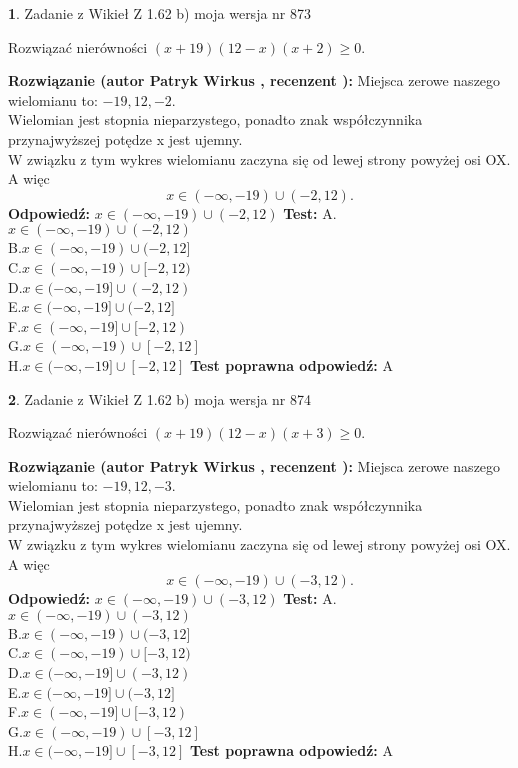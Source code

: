 \documentclass[12pt, a4paper]{article}
\theoremstyle{definition} %
\newtheorem{zad}{}
\newcommand{\zadStart}[1]{\begin{zad}#1\newline}
\newcommand{\zadStop}{\end{zad}}
\newcommand{\rozwStart}[2]{\noindent \textbf{Rozwiązanie (autor #1 , recenzent #2): }\newline}
\newcommand{\rozwStop}{\newline}
\newcommand{\odpStart}{\noindent \textbf{Odpowiedź:}\newline}
\newcommand{\odpStop}{\newline}
\newcommand{\testStart}{\noindent \textbf{Test:}\newline}
\newcommand{\testStop}{\newline}
\newcommand{\kluczStart}{\noindent \textbf{Test poprawna odpowiedź:}\newline}
\newcommand{\kluczStop}{\newline}
\begin{document}
\zadStart{Zadanie z Wikieł Z 1.62 b) moja wersja nr 873}

Rozwiązać nierówności $(x+19)(12-x)(x+2)\ge0$.
\zadStop
\rozwStart{Patryk Wirkus}{}
Miejsca zerowe naszego wielomianu to: $-19, 12, -2$.\\
Wielomian jest stopnia nieparzystego, ponadto znak współczynnika przy\linebreak najwyższej potędze x jest ujemny.\\ W związku z tym wykres wielomianu zaczyna się od lewej strony powyżej osi OX. A więc $$x \in (-\infty,-19) \cup (-2,12).$$
\rozwStop
\odpStart
$x \in (-\infty,-19) \cup (-2,12)$
\odpStop
\testStart
A.$x \in (-\infty,-19) \cup (-2,12)$\\
B.$x \in (-\infty,-19) \cup (-2,12]$\\
C.$x \in (-\infty,-19) \cup [-2,12)$\\
D.$x \in (-\infty,-19] \cup (-2,12)$\\
E.$x \in (-\infty,-19] \cup (-2,12]$\\
F.$x \in (-\infty,-19] \cup [-2,12)$\\
G.$x \in (-\infty,-19) \cup [-2,12]$\\
H.$x \in (-\infty,-19] \cup [-2,12]$
\testStop
\kluczStart
A
\kluczStop



\zadStart{Zadanie z Wikieł Z 1.62 b) moja wersja nr 874}

Rozwiązać nierówności $(x+19)(12-x)(x+3)\ge0$.
\zadStop
\rozwStart{Patryk Wirkus}{}
Miejsca zerowe naszego wielomianu to: $-19, 12, -3$.\\
Wielomian jest stopnia nieparzystego, ponadto znak współczynnika przy\linebreak najwyższej potędze x jest ujemny.\\ W związku z tym wykres wielomianu zaczyna się od lewej strony powyżej osi OX. A więc $$x \in (-\infty,-19) \cup (-3,12).$$
\rozwStop
\odpStart
$x \in (-\infty,-19) \cup (-3,12)$
\odpStop
\testStart
A.$x \in (-\infty,-19) \cup (-3,12)$\\
B.$x \in (-\infty,-19) \cup (-3,12]$\\
C.$x \in (-\infty,-19) \cup [-3,12)$\\
D.$x \in (-\infty,-19] \cup (-3,12)$\\
E.$x \in (-\infty,-19] \cup (-3,12]$\\
F.$x \in (-\infty,-19] \cup [-3,12)$\\
G.$x \in (-\infty,-19) \cup [-3,12]$\\
H.$x \in (-\infty,-19] \cup [-3,12]$
\testStop
\kluczStart
A
\kluczStop
\end{document}
